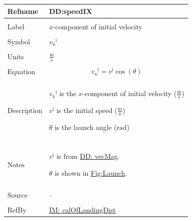 \documentclass[12pt]{article}
\begin{document}
\vspace{\baselineskip}
\noindent
\begin{minipage}{\textwidth}
\begin{tabular}{>{\raggedright}p{}>{\raggedright\arraybackslash}p{}}
\toprule \textbf{Refname} & \textbf{DD:speedIX}
\label{DD:speedIX}
\\ \midrule \\
Label & $x$-component of initial velocity
        
\\ \midrule \\
Symbol & ${{v_{\text{x}}}^{\text{i}}}$
         
\\ \midrule \\
Units & $\frac{\text{m}}{\text{s}}$
        
\\ \midrule \\
Equation & \begin{displaymath}
           {{v_{\text{x}}}^{\text{i}}}={v^{\text{i}}} \cos\left(θ\right)
           \end{displaymath}
\\ \midrule \\
Description & \begin{symbDescription}
              \item{${{v_{\text{x}}}^{\text{i}}}$ is the $x$-component of initial velocity ($\frac{\text{m}}{\text{s}}$)}
              \item{${v^{\text{i}}}$ is the initial speed ($\frac{\text{m}}{\text{s}}$)}
              \item{$θ$ is the launch angle (${\text{rad}}$)}
              \end{symbDescription}
\\ \midrule \\
Notes & ${v^{\text{i}}}$ is from \hyperref[DD:vecMag]{DD: vecMag}.
        
        $θ$ is shown in \hyperref[Figure:Launch]{Fig:Launch}.
        
\\ \midrule \\
Source & --
         
\\ \midrule \\
RefBy & \hyperref[IM:calOfLandingDist]{IM: calOfLandingDist}
        
\\ \bottomrule
\end{tabular}
\end{minipage}
\end{document}
